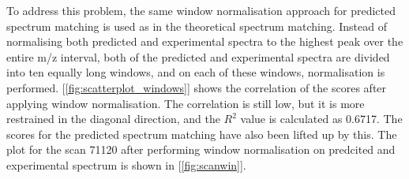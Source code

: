 \documentclass[11pt]{article}
\begin{document}
To address this problem, the same window normalisation approach for predicted spectrum matching is used as in the theoretical spectrum matching. Instead of normalising both predicted and experimental spectra to the highest peak over the entire m/z interval, both of the predicted and experimental spectra are divided into ten equally long windows, and on each of these windows, normalisation is performed. [\cref{fig:scatterplot_windows}] shows the correlation of the scores after applying window normalisation. The correlation is still low, but it is more restrained in the diagonal direction, and the \(R^2\) value is calculated as 0.6717. The scores for the predicted spectrum matching have also been lifted up by this. The plot for the scan 71120 after performing window normalisation on predcited and experimental spectrum is shown in [\cref{fig:scanwin}].
\end{document}
